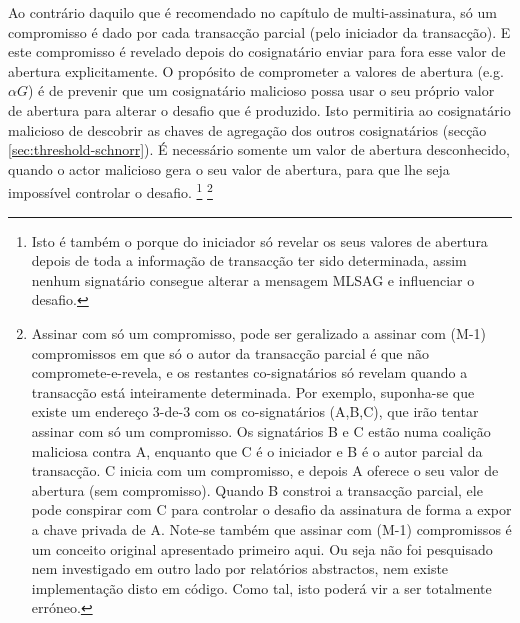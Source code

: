 Ao contrário daquilo que é recomendado no capítulo de multi-assinatura, só um compromisso é dado por cada transacção parcial (pelo iniciador da transacção). E este compromisso é revelado depois do cosignatário enviar para fora esse valor de abertura  explicitamente. O propósito de comprometer a valores de abertura (e.g. $\alpha G$) é de prevenir que um cosignatário malicioso possa usar o seu próprio valor de abertura para alterar o desafio que é produzido. Isto permitiria ao cosignatário malicioso de descobrir as chaves de agregação dos outros cosignatários (secção \ref{sec:threshold-schnorr}). \newline É necessário somente um valor de abertura desconhecido, quando o actor malicioso gera o seu valor de abertura, para que lhe seja impossível controlar o desafio.   
\footnote{Isto é também o porque do iniciador só revelar os seus valores de abertura depois de toda a informação de transacção ter sido determinada, assim nenhum signatário consegue alterar a mensagem MLSAG e influenciar o desafio.}
\footnote{Assinar com só um compromisso, pode ser geralizado a assinar com (M-1) compromissos em que só o autor da transacção parcial é que não compromete-e-revela, e os restantes co-signatários só revelam quando a transacção está inteiramente determinada. Por exemplo, suponha-se que existe um endereço 3-de-3 com os co-signatários (A,B,C), que irão tentar assinar com só um compromisso. Os signatários B e C estão numa coalição maliciosa contra A, enquanto que C é o iniciador e B é o autor parcial da transacção. C inicia com um compromisso, e depois A oferece o seu valor de abertura (sem compromisso). Quando B constroi a transacção parcial, ele pode conspirar com C para controlar o desafio da assinatura de forma a expor a chave privada de A. Note-se também que assinar com (M-1) compromissos é um conceito original apresentado primeiro aqui. Ou seja não foi pesquisado nem investigado em outro lado por relatórios abstractos, nem existe implementação disto em código. Como tal, isto poderá vir a ser totalmente erróneo.}

